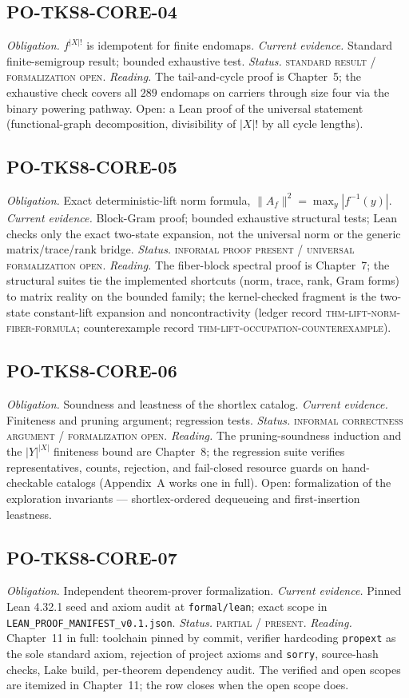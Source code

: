\subsection*{PO-TKS8-CORE-04}
\emph{Obligation.} $f^{|X|!}$ is idempotent for finite endomaps.
\emph{Current evidence.} Standard finite-semigroup result; bounded
exhaustive test. \emph{Status.} \textsc{standard result /
formalization open}. \emph{Reading.} The tail-and-cycle proof is
Chapter~5; the exhaustive check covers all $289$ endomaps on carriers
through size four via the binary powering pathway. Open: a Lean proof
of the universal statement (functional-graph decomposition,
divisibility of $|X|!$ by all cycle lengths).

\subsection*{PO-TKS8-CORE-05}
\emph{Obligation.} Exact deterministic-lift norm formula,
$\lVert A_f\rVert^2 = \max_{y}|f^{-1}(y)|$.
\emph{Current evidence.} Block-Gram proof; bounded exhaustive
structural tests; Lean checks only the exact two-state expansion, not
the universal norm or the generic matrix/trace/rank bridge.
\emph{Status.} \textsc{informal proof present / universal
formalization open}. \emph{Reading.} The fiber-block spectral proof is
Chapter~7; the structural suites tie the implemented shortcuts (norm,
trace, rank, Gram forms) to matrix reality on the bounded family; the
kernel-checked fragment is the two-state constant-lift expansion and
noncontractivity (ledger record
\textsc{thm-lift-norm-fiber-formula}; counterexample record
\textsc{thm-lift-occupation-counterexample}).

\subsection*{PO-TKS8-CORE-06}
\emph{Obligation.} Soundness and leastness of the shortlex catalog.
\emph{Current evidence.} Finiteness and pruning argument; regression
tests. \emph{Status.} \textsc{informal correctness argument /
formalization open}. \emph{Reading.} The pruning-soundness induction
and the $|Y|^{|X|}$ finiteness bound are Chapter~8; the regression
suite verifies representatives, counts, rejection, and fail-closed
resource guards on hand-checkable catalogs (Appendix~A works one in
full). Open: formalization of the exploration invariants ---
shortlex-ordered dequeueing and first-insertion leastness.

\subsection*{PO-TKS8-CORE-07}
\emph{Obligation.} Independent theorem-prover formalization.
\emph{Current evidence.} Pinned Lean 4.32.1 seed and axiom audit at
\texttt{formal/lean}; exact scope in
\texttt{LEAN\_PROOF\_MANIFEST\_v0.1.json}.
\emph{Status.} \textsc{partial / present}.
\emph{Reading.} Chapter~11 in full: toolchain pinned by commit,
verifier hardcoding \texttt{propext} as the sole standard axiom,
rejection of project axioms and \texttt{sorry}, source-hash checks,
Lake build, per-theorem dependency audit. The verified and open
scopes are itemized in Chapter~11; the row closes when the open scope
does.

